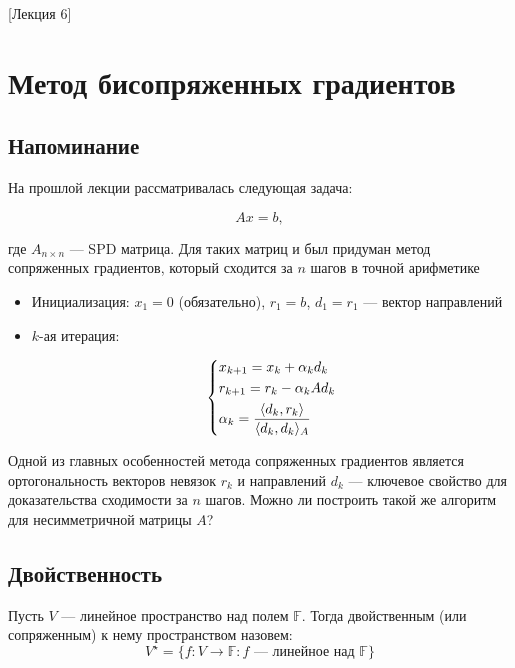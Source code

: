 [Лекция 6]

\newpage

\section{Метод бисопряженных градиентов}

\subsection*{Напоминание}

На прошлой лекции рассматривалась следующая задача:

$$
Ax = b,
$$

где $A_{n \times n}$ --- SPD матрица. Для таких матриц и был придуман метод сопряженных градиентов, который сходится за $n$ шагов в точной арифметике

\begin{itemize}
    \item Инициализация: $x_1 = 0$ (обязательно), $r_1 = b$, $d_1 = r_1$ --- вектор направлений

    \item $k$-ая итерация:

    \begin{equation*}
        \begin{dcases*}
            x_{k+1} = x_k + \alpha_k d_k\\
            r_{k+1} = r_k - \alpha_k A d_k\\
            \alpha_k = \frac{\langle d_k, r_k \rangle}{\langle d_k, d_k \rangle_A}\\
        \end{dcases*}
    \end{equation*}
\end{itemize}

Одной из главных особенностей метода сопряженных градиентов является ортогональность векторов невязок $r_k$ и направлений $d_k$ --- ключевое свойство для доказательства сходимости за $n$ шагов.
Можно ли построить такой же алгоритм для несимметричной матрицы $A$?

\subsection*{Двойственность}

\begin{definition}
    Пусть $V$ --- линейное пространство над полем $\mathbb{F}$. Тогда двойственным (или сопряженным) к нему пространством назовем:
    \[
        V^{\star} = \{f: V \longrightarrow \mathbb{F}: f \text{ --- линейное над } \mathbb{F} \}
    \]
\end{definition}

